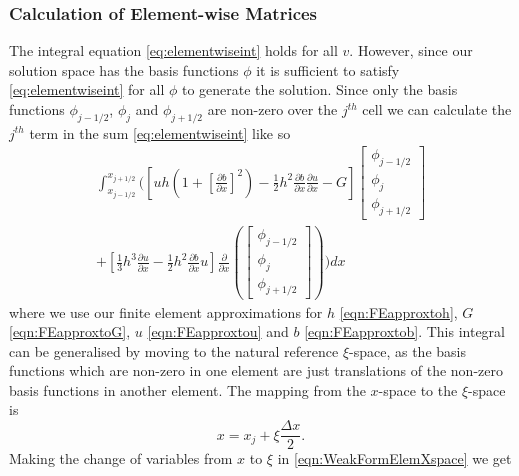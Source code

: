 \subsubsection{Calculation of Element-wise Matrices}
The integral equation \eqref{eq:elementwiseint} holds for all $v$. However, since our solution space has the basis functions $\phi$ it is sufficient to satisfy \eqref{eq:elementwiseint} for all $\phi$ to generate the solution. Since only the basis functions $\phi_{j-1/2}$, $\phi_{j}$ and $\phi_{j+1/2}$ are non-zero over the $j^{th}$ cell we can calculate the $j^{th}$ term in the sum \eqref{eq:elementwiseint} like so
\begin{multline}
\int_{x_{j-1/2} }^{{x_{j+1/2}}} \Bigg(  \left[ uh \left(1  +  \left[\frac{\partial b}{\partial x}\right]^2 \right)  - \frac{1}{2}h^2\frac{\partial b}{\partial x}  \frac{\partial u }{\partial x}  -  G \right] \begin{bmatrix}
\phi_{j-1/2}\\\phi_j \\\phi_{j+1/2}
\end{bmatrix}   \\ +  \left[ \frac{1}{3}h^3  \frac{\partial {u}}{\partial x}    -     \frac{1}{2}h^2\frac{\partial b}{\partial x} u    \right] \frac{\partial}{\partial x}\left(\begin{bmatrix}
\phi_{j-1/2}\\\phi_j \\\phi_{j+1/2}
\end{bmatrix} \right) \Bigg)dx
\label{eqn:WeakFormElemXspace}
\end{multline}
where we use our finite element approximations for $h$ \eqref{eqn:FEapproxtoh}, $G$ \eqref{eqn:FEapproxtoG}, $u$ \eqref{eqn:FEapproxtou} and $b$ \eqref{eqn:FEapproxtob}. This integral can be generalised by moving to the natural reference $\xi$-space, as the basis functions which are non-zero in one element are just translations of the non-zero basis functions in another element. The mapping from the $x$-space to the $\xi$-space is
\begin{equation*}
x = x_j + \xi \frac{\Delta x}{2}.
\end{equation*}
Making the change of variables from $x$ to $\xi$ in \eqref{eqn:WeakFormElemXspace} we get
